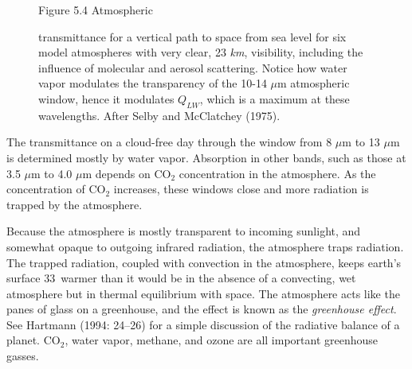 \begin{figure}[t!]
\footnotesize
Figure 5.4 Atmospheric \rule{0pt}{3ex}transmittance for a vertical path to space from sea level for six
model atmospheres with very clear, 23 \textit{km}, visibility,
including the influence of molecular and aerosol scattering. Notice
how water vapor modulates the transparency of the 10-14 $\mu$m
atmospheric window, hence it modulates $Q_{LW}$, which is a maximum at
these wavelengths.  After Selby and McClatchey (1975).
\label{fig:transmittance}
\vspace{-3ex}
\end{figure}

The transmittance on a cloud-free day through the window from 8 $\mu$m
to 13 $\mu$m is determined mostly by water vapor. Absorption in other
bands, such as those at 3.5 $\mu$m to 4.0 $\mu$m depends on CO$_2$
concentration in the atmosphere. As the concentration of CO$_2$
increases, these windows close and more radiation is trapped by the
atmosphere.

Because the atmosphere is mostly transparent to incoming sunlight, and
somewhat opaque to outgoing infrared radiation, the atmosphere traps
radiation. The trapped radiation, coupled with convection in the
atmosphere, keeps earth's surface 33\degrees\ warmer than it would be
in the absence of a convecting, wet atmosphere but in thermal
equilibrium with space. The atmosphere acts like the panes of glass on
a greenhouse, and the effect is known as the \textit{greenhouse
  effect}. See Hartmann (1994: 24--26)
for a simple discussion of the radiative balance of a planet. CO$_2$,
water vapor, methane, and ozone are all important greenhouse gasses.

